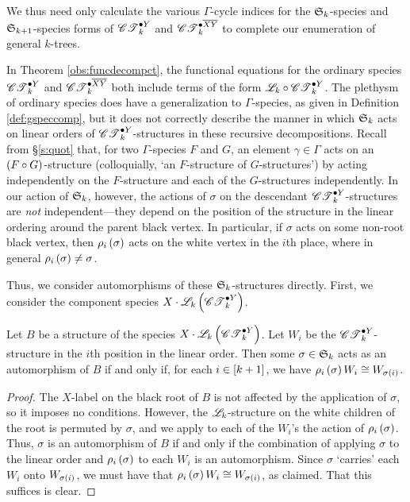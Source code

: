 \documentclass[sectionflow,singlespace,twoside,boldmathhdr,draft]{brandiss} %
\numberwithin{section}{chapter}
\numberwithin{figure}{chapter}
\begin{document}
We thus need only calculate the various $\Gamma$-cycle indices for the $\symgp{k}$-species and $\symgp{k+1}$-species forms of $\pointed[Y]{\specname{CT}}_{k}$ and $\pointed[\overline{XY}]{\specname{CT}}_{k}$ to complete our enumeration of general $k$-trees.

In Theorem \ref{obs:funcdecompct}, the functional equations for the ordinary species $\pointed[Y]{\specname{CT}}_{k}$ and $\pointed[\overline{XY}]{\specname{CT}}_{k}$ both include terms of the form $\specname{L}_{k} \circ \pointed[Y]{\specname{CT}}_{k}$.
The plethysm of ordinary species does have a generalization to $\Gamma$-species, as given in Definition \ref{def:gspeccomp}, but it does not correctly describe the manner in which $\symgp{k}$ acts on linear orders of $\pointed[Y]{\specname{CT}}_{k}$-structures in these recursive decompositions.
Recall from \S \ref{s:quot} that, for two $\Gamma$-species $F$ and $G$, an element $\gamma \in \Gamma$ acts on an $\pbrac{F \circ G}$-structure (colloquially, `an $F$-structure of $G$-structures') by acting independently on the $F$-structure and each of the $G$-structures independently.
In our action of $\symgp{k}$, however, the actions of $\sigma$ on the descendant $\pointed[Y]{\specname{CT}}_{k}$-structures are \emph{not} independent---they depend on the position of the structure in the linear ordering around the parent black vertex.
In particular, if $\sigma$ acts on some non-root black vertex, then $\rho_{i} \pbrac{\sigma}$ acts on the white vertex in the $i$th place, where in general $\rho_{i} \pbrac{\sigma} \neq \sigma$.

Thus, we consider automorphisms of these $\symgp{k}$-structures directly.
First, we consider the component species $X \cdot \specname{L}_{k} \pbrac{\pointed[Y]{\specname{CT}}_{k}}$.
\begin{lemma}
  \label{lem:ctyinvar}
  Let $B$ be a structure of the species $X \cdot \specname{L}_{k} \pbrac{\pointed[Y]{\specname{CT}}_{k}}$.
  Let $W_{i}$ be the $\pointed[Y]{\specname{CT}}_{k}$-structure in the $i$th position in the linear order.
  Then some $\sigma \in \symgp{k}$ acts as an automorphism of $B$ if and only if, for each $i \in \sbrac{k+1}$, we have $\rho_{i} \pbrac{\sigma} W_{i} \cong W_{\sigma \pbrac{i}}$.
\end{lemma}

\begin{proof}
  The $X$-label on the black root of $B$ is not affected by the application of $\sigma$, so it imposes no conditions.
  However, the $\specname{L}_{k}$-structure on the white children of the root is permuted by $\sigma$, and we apply to each of the $W_{i}$'s the action of $\rho_{i} \pbrac{\sigma}$.
  Thus, $\sigma$ is an automorphism of $B$ if and only if the combination of applying $\sigma$ to the linear order and $\rho_{i} \pbrac{\sigma}$ to each $W_{i}$ is an automorphism.
  Since $\sigma$ `carries' each $W_{i}$ onto $W_{\sigma \pbrac{i}}$, we must have that $\rho_{i} \pbrac{\sigma} W_{i} \cong W_{\sigma \pbrac{i}}$, as claimed.
  That this suffices is clear.
\end{proof}
\end{document}
